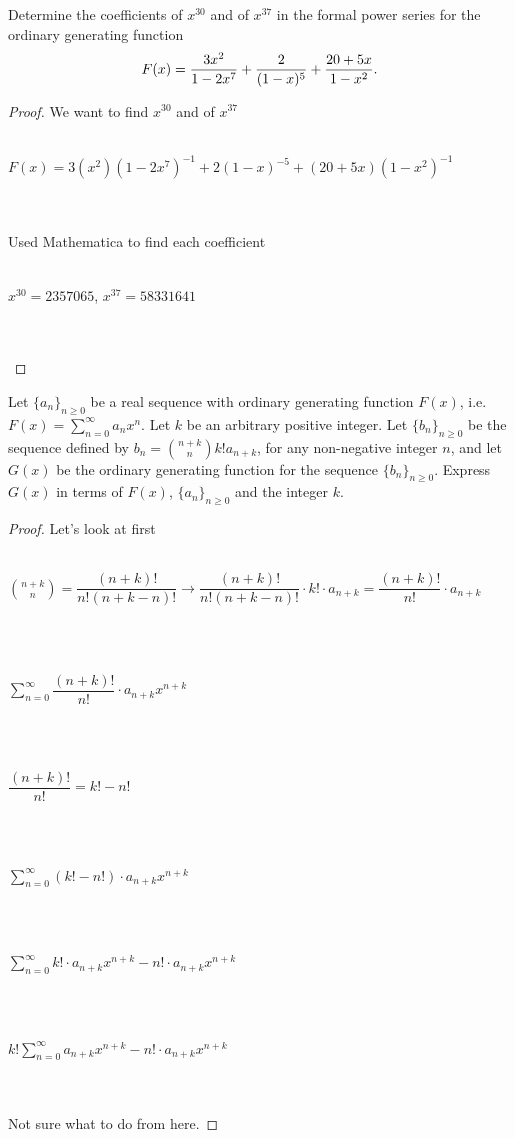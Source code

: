 \documentclass[12pt]{article}
\newenvironment{problem}[2][Problem]{\begin{trivlist}
\item[\hskip \labelsep {\bfseries #1}\hskip \labelsep {\bfseries #2.}]}{\end{trivlist}}
\begin{document}
\begin{problem}{2}
Determine the coefficients of $x^{30}$ and of $x^{37}$ in the formal power series for the ordinary generating function
$$F(x)={{3x^2}\over {1-2x^7}}+{2\over {(1-x)^5}}+{{20+5x}\over {1-x^2}}.$$
\end{problem}

\begin{proof}
We want to find $x^{30}$ and of $x^{37}$ \\ \\
\centerline{$F(x) = 3(x^2)(1-2x^7)^{-1}+2(1-x)^{-5}+(20+5x)(1-x^2)^{-1}$} \\ \\
Used Mathematica to find each coefficient \\ \\
\centerline{$x^{30} = 2357065$, $x^{37}=58331641$} \\ \\
\end{proof}

\begin{problem}{3}
Let $\{a_n\}_{n\geq 0}$ be a real sequence with ordinary generating function $F(x)$, i.e. $F(x)=\sum_{n=0}^{\infty}a_nx^n$. Let $k$ be an arbitrary positive integer.
Let $\{b_n\}_{n\geq 0}$ be the sequence defined by $b_n={{n+k}\choose n}k!a_{n+k}$, for any non-negative integer $n$, and let $G(x)$ be the ordinary generating function for the sequence $\{b_n\}_{n\geq 0}$. Express $G(x)$ in terms of $F(x)$, $\{a_n\}_{n\geq 0}$ and the integer $k$.\\
\end{problem}

\begin{proof}
Let's look at first \\ \\
\centerline{${n+k \choose n} = \dfrac{(n+k)!}{n!(n+k-n)!} \rightarrow  \dfrac{(n+k)!}{n!(n+k-n)!}  \cdot k! \cdot a_{n+k} = \dfrac{(n+k)!}{n!}\cdot a_{n+k}$} \\ \\
\centerline{ $\sum_{n=0}^{\infty} \dfrac{(n+k)!}{n!}\cdot a_{n+k}x^{n+k}$} \\ \\
\centerline{$\dfrac{(n+k)!}{n!} = k! - n!$} \\ \\
\centerline{$\sum_{n=0}^{\infty} (k! - n!)\cdot a_{n+k}x^{n+k}$} \\ \\
\centerline{$\sum_{n=0}^{\infty} k!\cdot a_{n+k}x^{n+k} - n! \cdot a_{n+k}x^{n+k}$} \\ \\
\centerline{$k!\sum_{n=0}^{\infty} a_{n+k}x^{n+k} - n! \cdot a_{n+k}x^{n+k}$} \\ \\
Not sure what to do from here.


\end{proof}
 
\end{document}
